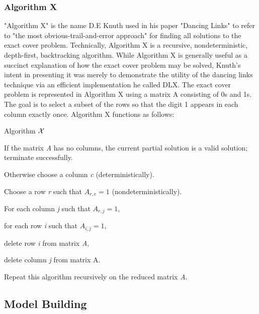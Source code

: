 \documentclass{mcmthesis}
\begin{document}
\subsubsection{Algorithm X}
"Algorithm X" is the name D.E Knuth used in his paper "Dancing Links" to refer to "the most obvious-trail-and-error approach" for finding all solutions to the exact cover problem. Technically, Algorithm X is a recursive, nondeterministic, depth-first, backtracking algorithm. While Algorithm X is generally useful as a succinct explanation of how the exact cover problem may be solved, Knuth's intent in presenting it was merely to demonstrate the utility of the dancing links technique via an efficient implementation he called DLX.\newline
\indent The exact cover problem is represented in Algorithm X using a matrix A consisting of 0s and 1s. The goal is to select a subset of the rows so that the digit 1 appears in each column exactly once. Algorithm X functions as follows:\\
\begin{framed}
\begin{list}{.}
    {\setlength{\parsep}{0ex}\setlength{\itemsep}{0ex}}
\item[] Algorithm $\cal X$
\item   If the matrix \textit{A} has no columns, the current partial solution is a valid solution; terminate successfully.
\item   Otherwise choose a column \textit{c} (deterministically).
\item 	Choose a row \textit{r} such that $A_{r, c} = 1$ (nondeterministically).
\item For each column \textit{j} such that $A_{r, j} = 1$, 
\item \qquad for each row \textit{i} such that $A_{i,j} = 1$,
\item \qquad \qquad delete row \textit{i} from matrix \textit{A},
\item \qquad delete column \textit{j} from matrix A.
\item Repeat this algorithm recursively on the reduced matrix \textit{A}.
\end{list}
\end{framed}

\subsection{Model Building}
\end{document}
